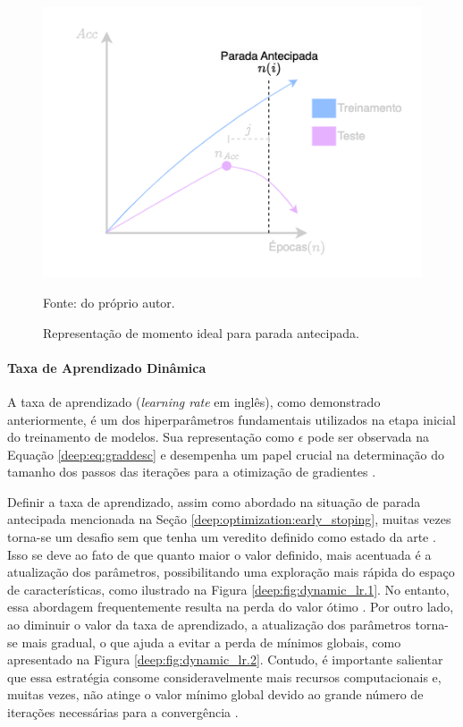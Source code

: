 \begin{figure}[H]
    \centering
    \caption{Representação de momento ideal para parada antecipada.}
    \includegraphics[width=0.6\linewidth]{recursos/imagens/deep/early_stopping.png}
    \label{deep:fig:earlystopping}

    Fonte: do próprio autor.
\end{figure}

\paragraph{Taxa de Aprendizado Dinâmica}
\label{deep:optimization:dynamic_lr}

A taxa de aprendizado (\textit{learning rate} em inglês), como demonstrado anteriormente, é um dos hiperparâmetros fundamentais utilizados na etapa inicial do treinamento de modelos. Sua representação como $\epsilon$ pode ser observada na Equação \ref{deep:eq:graddesc} e desempenha um papel crucial na determinação do tamanho dos passos das iterações para a otimização de gradientes \citep{Smith2017CyclicalNetworks}.

Definir a taxa de aprendizado, assim como abordado na situação de parada antecipada mencionada na Seção \ref{deep:optimization:early_stoping}, muitas vezes torna-se um desafio sem que tenha um veredito definido como estado da arte \citep{Goodfellow2016}. Isso se deve ao fato de que quanto maior o valor definido, mais acentuada é a atualização dos parâmetros, possibilitando uma exploração mais rápida do espaço de características, como ilustrado na Figura \ref{deep:fig:dynamic_lr.1}. No entanto, essa abordagem frequentemente resulta na perda do valor ótimo \citep{Tang2021AnPump}. Por outro lado, ao diminuir o valor da taxa de aprendizado, a atualização dos parâmetros torna-se mais gradual, o que ajuda a evitar a perda de mínimos globais, como apresentado na Figura \ref{deep:fig:dynamic_lr.2}. Contudo, é importante salientar que essa estratégia consome consideravelmente mais recursos computacionais e, muitas vezes, não atinge o valor mínimo global devido ao grande número de iterações necessárias para a convergência \citep{Tang2021AnPump}.

